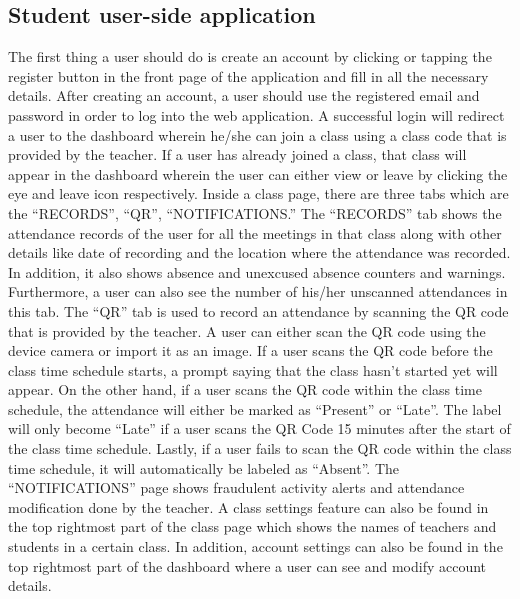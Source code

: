 \documentclass[journal]{./IEEE/IEEEtran}
\begin{document}
\subsection{Student user-side application}
The first thing a user should do is create an account by clicking or tapping the register button in the front page of the application and fill in all the necessary details. After creating an account, a user should use the registered email and password in order to log into the web application. A successful login will redirect a user to the dashboard wherein he/she can join a class using a class code that is provided by the teacher. If a user has already joined a class, that class will appear in the dashboard wherein the user can either view or leave by clicking the eye and  leave icon respectively. Inside a class page, there are three tabs which are the “RECORDS”, “QR”, “NOTIFICATIONS.” The “RECORDS” tab shows  the attendance records of the user for all the meetings in that class along with other details like date of recording and the location where the attendance was recorded. In addition, it also shows absence and unexcused absence counters and warnings. Furthermore, a user can also see the number of his/her unscanned attendances in this tab. The “QR” tab is used to record an attendance by scanning the QR code that is provided by the teacher. A user can either scan the QR code using the device camera or import it as an image. If a user scans the QR code before the class time schedule starts, a prompt saying that the class hasn’t started yet will appear. On the other hand, if a user scans the QR code within the class time schedule, the attendance will either be marked as “Present” or “Late”. The label will only become “Late” if a user scans the QR Code 15 minutes after the start of the class time schedule. Lastly, if a user fails to scan the QR code within the class time schedule, it will automatically be labeled as “Absent”.  The “NOTIFICATIONS” page shows fraudulent activity alerts and attendance modification done by the teacher. A class settings feature can also be found in the top rightmost part of the class page which shows the names of teachers and students in a certain class. In addition, account settings can also be found in the top rightmost part of the dashboard where a user can see and modify account details.
\end{document}
